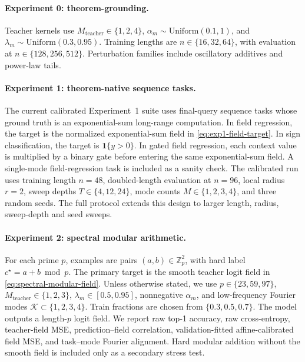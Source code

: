 \documentclass[11pt]{article}
\theoremstyle{definition}
\begin{document}
\paragraph{Experiment 0: theorem-grounding.}
Teacher kernels use \(M_{\mathrm{teacher}}\in\{1,2,4\}\), \(\alpha_m\sim \mathrm{Uniform}(0.1,1)\), and \(\lambda_m\sim \mathrm{Uniform}(0.3,0.95)\). Training lengths are \(n\in\{16,32,64\}\), with evaluation at \(n\in\{128,256,512\}\). Perturbation families include oscillatory additives and power-law tails.

\paragraph{Experiment 1: theorem-native sequence tasks.}
The current calibrated Experiment~1 suite uses final-query sequence tasks whose ground truth is an exponential-sum long-range computation. In field regression, the target is the normalized exponential-sum field in \eqref{eq:exp1-field-target}. In sign classification, the target is \(\mathbf 1\{y>0\}\). In gated field regression, each context value is multiplied by a binary gate before entering the same exponential-sum field. A single-mode field-regression task is included as a sanity check. The calibrated run uses training length \(n=48\), doubled-length evaluation at \(n=96\), local radius \(r=2\), sweep depths \(T\in\{4,12,24\}\), mode counts \(M\in\{1,2,3,4\}\), and three random seeds. The full protocol extends this design to larger length, radius, sweep-depth and seed sweeps.

\paragraph{Experiment 2: spectral modular arithmetic.}
For each prime \(p\), examples are pairs \((a,b)\in\mathbb Z_p^2\), with hard label \(c^\star=a+b\bmod p\). The primary target is the smooth teacher logit field in \eqref{eq:spectral-modular-field}. Unless otherwise stated, we use \(p\in\{23,59,97\}\), \(M_{\mathrm{teacher}}\in\{1,2,3\}\), \(\lambda_m\in[0.5,0.95]\), nonnegative \(\alpha_m\), and low-frequency Fourier modes \(\mathcal K\subset\{1,2,3,4\}\). Train fractions are chosen from \(\{0.3,0.5,0.7\}\). The model outputs a length-\(p\) logit field. We report raw top-1 accuracy, raw cross-entropy, teacher-field MSE, prediction--field correlation, validation-fitted affine-calibrated field MSE, and task--mode Fourier alignment. Hard modular addition without the smooth field is included only as a secondary stress test.
\end{document}
